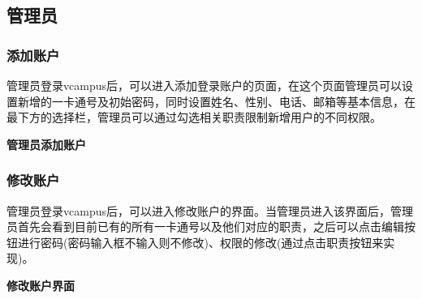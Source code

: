 \documentclass{article}
\begin{document}
\subsection{管理员}

\subsubsection{添加账户}
管理员登录vcampus后，可以进入添加登录账户的页面，在这个页面管理员可以设置新增的一卡通号及初始密码，同时设置姓名、性别、电话、邮箱等基本信息，在最下方的选择栏，管理员可以通过勾选相关职责限制新增用户的不同权限。
\begin{center}
\textbf{管理员添加账户}
\end{center}


\subsubsection{修改账户}
管理员登录vcampus后，可以进入修改账户的界面。当管理员进入该界面后，管理员首先会看到目前已有的所有一卡通号以及他们对应的职责，之后可以点击编辑按钮进行密码(密码输入框不输入则不修改)、权限的修改(通过点击职责按钮来实现)。

\begin{center}
\textbf{修改账户界面}
\end{center}
\end{document}
